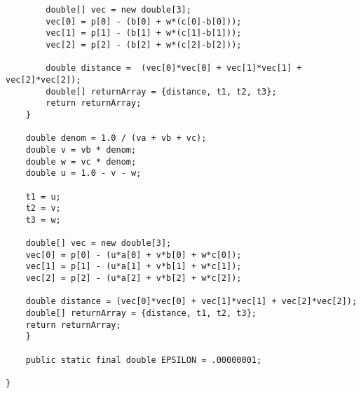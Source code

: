 \begin{lstlisting}
	    double[] vec = new double[3];
	    vec[0] = p[0] - (b[0] + w*(c[0]-b[0]));
	    vec[1] = p[1] - (b[1] + w*(c[1]-b[1]));
	    vec[2] = p[2] - (b[2] + w*(c[2]-b[2]));
	    
	    double distance =  (vec[0]*vec[0] + vec[1]*vec[1] + vec[2]*vec[2]);
	    double[] returnArray = {distance, t1, t2, t3};
	    return returnArray;
	}
	
	double denom = 1.0 / (va + vb + vc);
	double v = vb * denom;
	double w = vc * denom;
	double u = 1.0 - v - w;

	t1 = u;
	t2 = v;
	t3 = w;

	double[] vec = new double[3];
	vec[0] = p[0] - (u*a[0] + v*b[0] + w*c[0]);
	vec[1] = p[1] - (u*a[1] + v*b[1] + w*c[1]);
	vec[2] = p[2] - (u*a[2] + v*b[2] + w*c[2]);

	double distance = (vec[0]*vec[0] + vec[1]*vec[1] + vec[2]*vec[2]);
	double[] returnArray = {distance, t1, t2, t3};
	return returnArray;
    }
    
    public static final double EPSILON = .00000001;

}\end{lstlisting}

